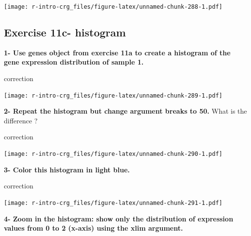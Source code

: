 \documentclass[]{book}
\newenvironment{Shaded}{\begin{snugshade}}{\end{snugshade}}
\newcommand{\DataTypeTok}[1]{\textcolor[rgb]{0.13,0.29,0.53}{#1}}
\newcommand{\DecValTok}[1]{\textcolor[rgb]{0.00,0.00,0.81}{#1}}
\newcommand{\KeywordTok}[1]{\textcolor[rgb]{0.13,0.29,0.53}{\textbf{#1}}}
\newcommand{\NormalTok}[1]{#1}
\newcommand{\OperatorTok}[1]{\textcolor[rgb]{0.81,0.36,0.00}{\textbf{#1}}}
\newcommand{\StringTok}[1]{\textcolor[rgb]{0.31,0.60,0.02}{#1}}
\begin{document}
\texttt{[image: r-intro-crg\_files/figure-latex/unnamed-chunk-288-1.pdf]}

\hypertarget{exercise-11c--histogram}{%
\subsection{Exercise 11c- histogram}\label{exercise-11c--histogram}}

\textbf{1- Use genes object from exercise 11a to create a histogram of the gene expression distribution of sample 1.}

correction

\begin{Shaded}
\end{Shaded}

\texttt{[image: r-intro-crg\_files/figure-latex/unnamed-chunk-289-1.pdf]}

\textbf{2- Repeat the histogram but change argument breaks to 50.}
What is the difference ?

correction

\begin{Shaded}
\end{Shaded}

\texttt{[image: r-intro-crg\_files/figure-latex/unnamed-chunk-290-1.pdf]}

\textbf{3- Color this histogram in light blue.}

correction

\begin{Shaded}
\end{Shaded}

\texttt{[image: r-intro-crg\_files/figure-latex/unnamed-chunk-291-1.pdf]}

\textbf{4- Zoom in the histogram: show only the distribution of expression values from 0 to 2 (x-axis) using the xlim argument.}
\end{document}
